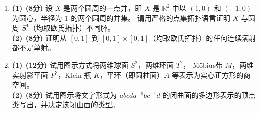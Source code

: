 \begin{enumerate}
\item[五] \textbf{(1) (8分)} 设 $X$ 是两个圆周的一点并，即 $X$ 是 $\mathbb{R}^2$ 中以 $(1,0)$ 和 $(-1,0)$ 为圆心，半径为 $1$ 的两个圆周的并集。
请用严格的点集拓扑语言证明 $X$ 与圆周 $S^1$（均取欧氏拓扑）不同肧。\\
\textbf{(2) (8分)} 证明从 $[0,1]$ 到 $[0,1] \times [0,1]$（均取欧氏拓扑）的任何连续满射都不是单射。

\item[六] \textbf{(1) (12分)} 试用图示方式将两维球面 $S^2$，两维环面 $T^2$，
Möbius带 $M$，两维实射影平面 $P^2$，Klein 瓶 $K$，平环（即圆柱面）$A$ 等表示为实心正方形的商空间。\\
\textbf{(2) (8分)} 试用图示将文字形式为 $abcda^{-1}bc^{-1}d$ 的闭曲面的多边形表示的顶点类写出，并决定该闭曲面的类型。
\end{enumerate}